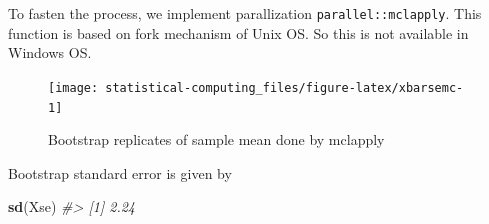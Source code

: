 \documentclass[]{book}
\newenvironment{Shaded}{\begin{snugshade}}{\end{snugshade}}
\newcommand{\CommentTok}[1]{\textcolor[rgb]{0.56,0.35,0.01}{\textit{#1}}}
\newcommand{\ControlFlowTok}[1]{\textcolor[rgb]{0.13,0.29,0.53}{\textbf{#1}}}
\newcommand{\DataTypeTok}[1]{\textcolor[rgb]{0.13,0.29,0.53}{#1}}
\newcommand{\DecValTok}[1]{\textcolor[rgb]{0.00,0.00,0.81}{#1}}
\newcommand{\KeywordTok}[1]{\textcolor[rgb]{0.13,0.29,0.53}{\textbf{#1}}}
\newcommand{\NormalTok}[1]{#1}
\newcommand{\OperatorTok}[1]{\textcolor[rgb]{0.81,0.36,0.00}{\textbf{#1}}}
\newcommand{\StringTok}[1]{\textcolor[rgb]{0.31,0.60,0.02}{#1}}
\theoremstyle{definition}
\theoremstyle{definition}
\theoremstyle{definition}
\theoremstyle{remark}
\begin{document}
To fasten the process, we implement parallization \texttt{parallel::mclapply}. This function is based on fork mechanism of Unix OS. So this is not available in Windows OS.

\begin{Shaded}
\end{Shaded}

\begin{Shaded}
\end{Shaded}

\begin{figure}[H]

{\centering \texttt{[image: statistical-computing\_files/figure-latex/xbarsemc-1]} 

}

\caption{Bootstrap replicates of sample mean done by mclapply}\label{fig:xbarsemc}
\end{figure}

Bootstrap standard error is given by

\begin{Shaded}
\begin{Highlighting}[]
\KeywordTok{sd}\NormalTok{(Xse)}
\CommentTok{#> [1] 2.24}
\end{Highlighting}
\end{Shaded}
\end{document}
